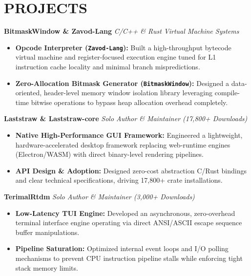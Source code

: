 \documentclass[letterpaper,11pt]{article}
\begin{document}



\section{PROJECTS}

\noindent\textbf{BitmaskWindow \& Zavod-Lang} \hfill \textit{C/C++ \& Rust Virtual Machine Systems}
\begin{itemize}[noitemsep, topsep=2pt, leftmargin=1.2em]
    \item \textbf{Opcode Interpreter (\texttt{Zavod-Lang}):} Built a high-throughput bytecode virtual machine and register-focused execution engine tuned for L1 instruction cache locality and minimal branch mispredictions.
    \item \textbf{Zero-Allocation Bitmask Generator (\texttt{BitmaskWindow}):} Designed a data-oriented, header-level memory window isolation library leveraging compile-time bitwise operations to bypass heap allocation overhead completely.
\end{itemize}

\vspace{4pt}

\noindent\textbf{Laststraw \& Laststraw-core} \hfill \textit{Solo Author \& Maintainer (17,800+ Downloads)}
\begin{itemize}[noitemsep, topsep=2pt, leftmargin=1.2em]
    \item \textbf{Native High-Performance GUI Framework:} Engineered a lightweight, hardware-accelerated desktop framework replacing web-runtime engines (Electron/WASM) with direct binary-level rendering pipelines.
    \item \textbf{API Design \& Adoption:} Designed zero-cost abstraction C/Rust bindings and clear technical specifications, driving 17,800+ crate installations.
\end{itemize}

\vspace{4pt}

\noindent\textbf{TerimalRtdm} \hfill \textit{Solo Author \& Maintainer (3,000+ Downloads)}
\begin{itemize}[noitemsep, topsep=2pt, leftmargin=1.2em]
    \item \textbf{Low-Latency TUI Engine:} Developed an asynchronous, zero-overhead terminal interface engine operating via direct ANSI/ASCII escape sequence buffer manipulations.
    \item \textbf{Pipeline Saturation:} Optimized internal event loops and I/O polling mechanisms to prevent CPU instruction pipeline stalls while enforcing tight stack memory limits.
\end{itemize}
\end{document}
